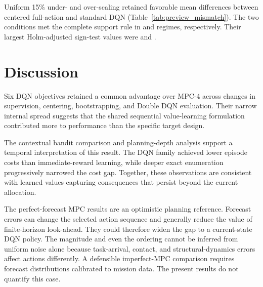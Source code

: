 \documentclass[remotesensing,article,submit,moreauthors]{Definitions/mdpi}
\newenvironment{revisedblock}{\color{red}}{}
\newenvironment{revisedblock}{}{}
\begin{document}
\begin{table}[H]
\centering
\caption{Effect of training-time preview misspecification. Differences are relative to the same standard DQN models evaluated in the factual simulator. Scaling applies only to the centered full-action variant's training-time preview cost and action-induced resource changes.}
\label{tab:preview_mismatch}
\resizebox{\textwidth}{!}{}
\end{table}

Uniform 15\% under- and over-scaling retained favorable mean differences between centered full-action and standard DQN (Table~\ref{tab:preview_mismatch}). The two conditions met the complete support rule in \MismatchLowSupportedCount{} and \MismatchHighSupportedCount{} regimes, respectively. Their largest Holm-adjusted sign-test values were \MismatchLowHolmPMax{} and \MismatchHighHolmPMax.

\section{Discussion}

Six DQN objectives retained a common advantage over MPC-4 across changes in supervision, centering, bootstrapping, and Double DQN evaluation. Their narrow internal spread suggests that the shared sequential value-learning formulation contributed more to performance than the specific target design.

The contextual bandit comparison and planning-depth analysis support a temporal interpretation of this result. The DQN family achieved lower episode costs than immediate-reward learning, while deeper exact enumeration progressively narrowed the cost gap. Together, these observations are consistent with learned values capturing consequences that persist beyond the current allocation.

\begin{revisedblock}
The perfect-forecast MPC results are an optimistic planning reference. Forecast errors can change the selected action sequence and generally reduce the value of finite-horizon look-ahead. They could therefore widen the gap to a current-state DQN policy. The magnitude and even the ordering cannot be inferred from uniform noise alone because task-arrival, contact, and structural-dynamics errors affect actions differently. A defensible imperfect-MPC comparison requires forecast distributions calibrated to mission data. The present results do not quantify this case.
\end{revisedblock}
\end{document}
